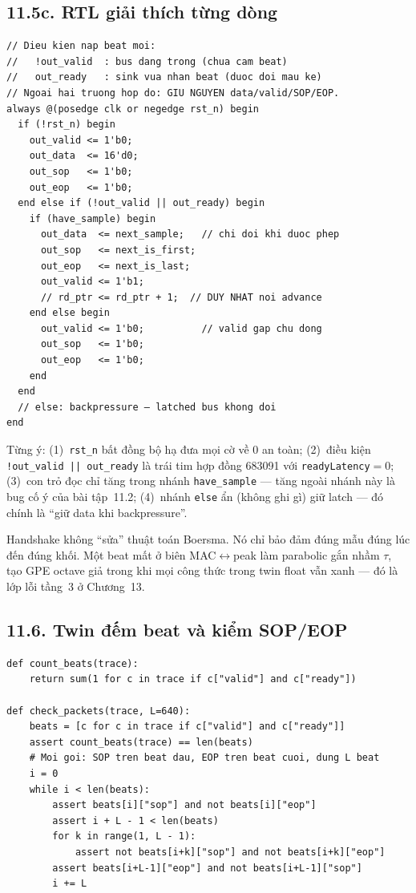 \subsection*{11.5c. RTL giải thích từng dòng}

\begin{verbatim}
// Dieu kien nap beat moi:
//   !out_valid  : bus dang trong (chua cam beat)
//   out_ready   : sink vua nhan beat (duoc doi mau ke)
// Ngoai hai truong hop do: GIU NGUYEN data/valid/SOP/EOP.
always @(posedge clk or negedge rst_n) begin
  if (!rst_n) begin
    out_valid <= 1'b0;
    out_data  <= 16'd0;
    out_sop   <= 1'b0;
    out_eop   <= 1'b0;
  end else if (!out_valid || out_ready) begin
    if (have_sample) begin
      out_data  <= next_sample;   // chi doi khi duoc phep
      out_sop   <= next_is_first;
      out_eop   <= next_is_last;
      out_valid <= 1'b1;
      // rd_ptr <= rd_ptr + 1;  // DUY NHAT noi advance
    end else begin
      out_valid <= 1'b0;          // valid gap chu dong
      out_sop   <= 1'b0;
      out_eop   <= 1'b0;
    end
  end
  // else: backpressure — latched bus khong doi
end
\end{verbatim}

Từng ý: (1)~\texttt{rst\_n} bất đồng bộ hạ đưa mọi cờ về $0$ an toàn; (2)~điều kiện \texttt{!out\_valid || out\_ready} là trái tim hợp đồng 683091 với \texttt{readyLatency}$=0$; (3)~con trỏ đọc chỉ tăng trong nhánh \texttt{have\_sample} --- tăng ngoài nhánh này là bug cố ý của bài tập~11.2; (4)~nhánh \texttt{else} ẩn (không ghi gì) giữ latch --- đó chính là ``giữ data khi backpressure''.

\begin{physicalinsight}
Handshake không ``sửa'' thuật toán Boersma. Nó chỉ bảo đảm đúng mẫu đúng lúc đến đúng khối. Một beat mất ở biên MAC$\leftrightarrow$peak làm parabolic gắn nhầm $\tau$, tạo GPE octave giả trong khi mọi công thức trong twin float vẫn xanh --- đó là lớp lỗi tầng~3 ở Chương~13.
\end{physicalinsight}


\subsection*{11.6. Twin đếm beat và kiểm SOP/EOP}

\begin{verbatim}
def count_beats(trace):
    return sum(1 for c in trace if c["valid"] and c["ready"])

def check_packets(trace, L=640):
    beats = [c for c in trace if c["valid"] and c["ready"]]
    assert count_beats(trace) == len(beats)
    # Moi goi: SOP tren beat dau, EOP tren beat cuoi, dung L beat
    i = 0
    while i < len(beats):
        assert beats[i]["sop"] and not beats[i]["eop"]
        assert i + L - 1 < len(beats)
        for k in range(1, L - 1):
            assert not beats[i+k]["sop"] and not beats[i+k]["eop"]
        assert beats[i+L-1]["eop"] and not beats[i+L-1]["sop"]
        i += L
\end{verbatim}

